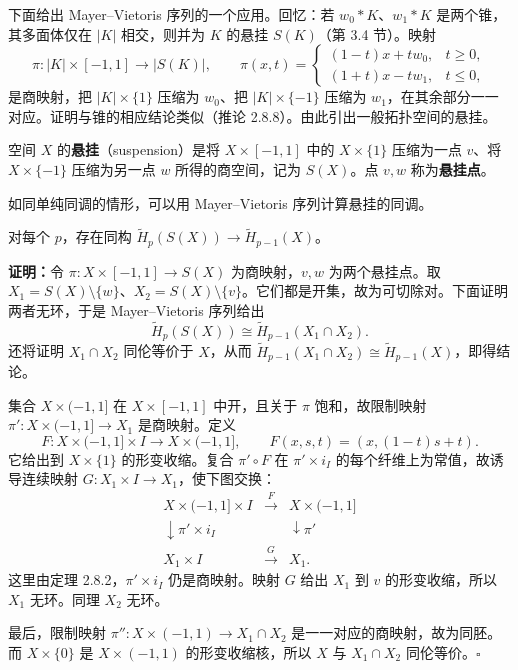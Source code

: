下面给出 Mayer--Vietoris 序列的一个应用。回忆：若 $w_0*K$、$w_1*K$ 是两个锥，其多面体仅在 $|K|$ 相交，则并为 $K$ 的悬挂 $S(K)$（第 3.4 节）。映射
\[
\pi:|K|\times[-1,1]\to|S(K)|,\qquad
\pi(x,t)=\begin{cases}(1-t)x+tw_0,&t\ge0,\\(1+t)x-tw_1,&t\le0,\end{cases}
\]
是商映射，把 $|K|\times\{1\}$ 压缩为 $w_0$、把 $|K|\times\{-1\}$ 压缩为 $w_1$，在其余部分一一对应。证明与锥的相应结论类似（推论 2.8.8）。由此引出一般拓扑空间的悬挂。

空间 $X$ 的\textbf{悬挂}（suspension）是将 $X\times[-1,1]$ 中的 $X\times\{1\}$ 压缩为一点 $v$、将 $X\times\{-1\}$ 压缩为另一点 $w$ 所得的商空间，记为 $S(X)$。点 $v,w$ 称为\textbf{悬挂点}。

如同单纯同调的情形，可以用 Mayer--Vietoris 序列计算悬挂的同调。

对每个 $p$，存在同构 $\widetilde H_p(S(X))\to\widetilde H_{p-1}(X)$。

\textbf{证明：}令 $\pi:X\times[-1,1]\to S(X)$ 为商映射，$v,w$ 为两个悬挂点。取 $X_1=S(X)\setminus\{w\}$、$X_2=S(X)\setminus\{v\}$。它们都是开集，故为可切除对。下面证明两者无环，于是 Mayer--Vietoris 序列给出
\[
\widetilde H_p(S(X))\cong\widetilde H_{p-1}(X_1\cap X_2).
\]
还将证明 $X_1\cap X_2$ 同伦等价于 $X$，从而 $\widetilde H_{p-1}(X_1\cap X_2)\cong\widetilde H_{p-1}(X)$，即得结论。

集合 $X\times(-1,1]$ 在 $X\times[-1,1]$ 中开，且关于 $\pi$ 饱和，故限制映射 $\pi':X\times(-1,1]\to X_1$ 是商映射。定义
\[
F:X\times(-1,1]\times I\to X\times(-1,1],\qquad
F(x,s,t)=(x,(1-t)s+t).
\]
它给出到 $X\times\{1\}$ 的形变收缩。复合 $\pi'\circ F$ 在 $\pi'\times i_I$ 的每个纤维上为常值，故诱导连续映射 $G:X_1\times I\to X_1$，使下图交换：
\[
\begin{array}{ccc}
X\times(-1,1]\times I&\xrightarrow{F}&X\times(-1,1]\\
\downarrow\scriptstyle\pi'\times i_I&&\downarrow\scriptstyle\pi'\\
X_1\times I&\xrightarrow{G}&X_1.
\end{array}
\]
这里由定理 2.8.2，$\pi'\times i_I$ 仍是商映射。映射 $G$ 给出 $X_1$ 到 $v$ 的形变收缩，所以 $X_1$ 无环。同理 $X_2$ 无环。

最后，限制映射 $\pi'':X\times(-1,1)\to X_1\cap X_2$ 是一一对应的商映射，故为同胚。而 $X\times\{0\}$ 是 $X\times(-1,1)$ 的形变收缩核，所以 $X$ 与 $X_1\cap X_2$ 同伦等价。\hfill$\square$

